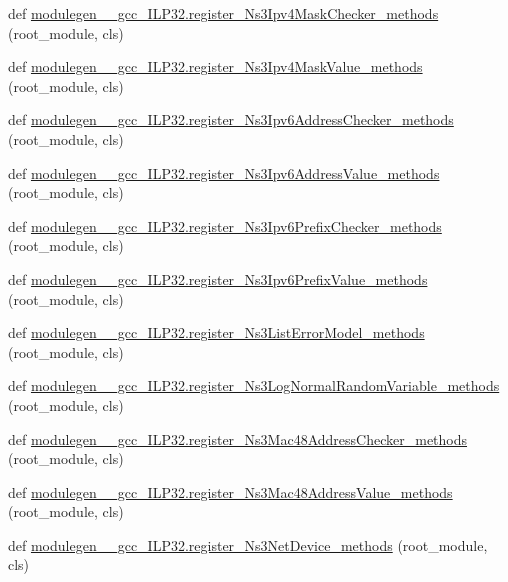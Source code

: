 \begin{DoxyCompactItemize}
\item 
def \hyperlink{namespacemodulegen____gcc__ILP32_a0c8c90b61f4e832ecf41510f18e20e98}{modulegen\+\_\+\+\_\+gcc\+\_\+\+I\+L\+P32.\+register\+\_\+\+Ns3\+Ipv4\+Mask\+Checker\+\_\+methods} (root\+\_\+module, cls)
\item 
def \hyperlink{namespacemodulegen____gcc__ILP32_aa0677871460e65b32fe90ab9bef43b9f}{modulegen\+\_\+\+\_\+gcc\+\_\+\+I\+L\+P32.\+register\+\_\+\+Ns3\+Ipv4\+Mask\+Value\+\_\+methods} (root\+\_\+module, cls)
\item 
def \hyperlink{namespacemodulegen____gcc__ILP32_aed7bbb9a518f22e7091964769eb4c4d3}{modulegen\+\_\+\+\_\+gcc\+\_\+\+I\+L\+P32.\+register\+\_\+\+Ns3\+Ipv6\+Address\+Checker\+\_\+methods} (root\+\_\+module, cls)
\item 
def \hyperlink{namespacemodulegen____gcc__ILP32_a94efe88582382700df8f33c69780357b}{modulegen\+\_\+\+\_\+gcc\+\_\+\+I\+L\+P32.\+register\+\_\+\+Ns3\+Ipv6\+Address\+Value\+\_\+methods} (root\+\_\+module, cls)
\item 
def \hyperlink{namespacemodulegen____gcc__ILP32_a98ee840f5ce1609ca10ebe6eb1022047}{modulegen\+\_\+\+\_\+gcc\+\_\+\+I\+L\+P32.\+register\+\_\+\+Ns3\+Ipv6\+Prefix\+Checker\+\_\+methods} (root\+\_\+module, cls)
\item 
def \hyperlink{namespacemodulegen____gcc__ILP32_a0b720f36ae3a4e1b9a79eba05de63e4a}{modulegen\+\_\+\+\_\+gcc\+\_\+\+I\+L\+P32.\+register\+\_\+\+Ns3\+Ipv6\+Prefix\+Value\+\_\+methods} (root\+\_\+module, cls)
\item 
def \hyperlink{namespacemodulegen____gcc__ILP32_a9b58e3894aa53b4ebdfad6a801d13903}{modulegen\+\_\+\+\_\+gcc\+\_\+\+I\+L\+P32.\+register\+\_\+\+Ns3\+List\+Error\+Model\+\_\+methods} (root\+\_\+module, cls)
\item 
def \hyperlink{namespacemodulegen____gcc__ILP32_a4f3a1c9e4d2390051bc66d0321f466e5}{modulegen\+\_\+\+\_\+gcc\+\_\+\+I\+L\+P32.\+register\+\_\+\+Ns3\+Log\+Normal\+Random\+Variable\+\_\+methods} (root\+\_\+module, cls)
\item 
def \hyperlink{namespacemodulegen____gcc__ILP32_a9a21f6afbd8086013a32b274dbadbbfe}{modulegen\+\_\+\+\_\+gcc\+\_\+\+I\+L\+P32.\+register\+\_\+\+Ns3\+Mac48\+Address\+Checker\+\_\+methods} (root\+\_\+module, cls)
\item 
def \hyperlink{namespacemodulegen____gcc__ILP32_acd3d4984a8cfb1ebfef0f6abc746e62c}{modulegen\+\_\+\+\_\+gcc\+\_\+\+I\+L\+P32.\+register\+\_\+\+Ns3\+Mac48\+Address\+Value\+\_\+methods} (root\+\_\+module, cls)
\item 
def \hyperlink{namespacemodulegen____gcc__ILP32_a88fafb58aa743dae1a3acfbbb6787697}{modulegen\+\_\+\+\_\+gcc\+\_\+\+I\+L\+P32.\+register\+\_\+\+Ns3\+Net\+Device\+\_\+methods} (root\+\_\+module, cls)

\end{DoxyCompactItemize}
